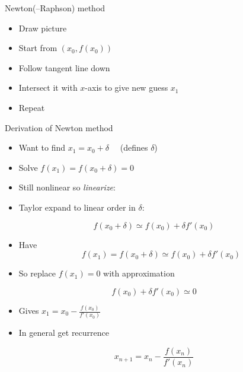 \begin{frame}{Newton(--Raphson) method}
\protect\hypertarget{newtonraphson-method}{}

\begin{itemize}
\item
  Draw picture
\item
  Start from \((x_0, f(x_0))\)
\item
  Follow tangent line down
\item
  Intersect it with \(x\)-axis to give new guess \(x_1\)
\item
  Repeat
\end{itemize}

\end{frame}

\begin{frame}{Derivation of Newton method}
\protect\hypertarget{derivation-of-newton-method}{}

\begin{itemize}
\item
  Want to find \(x_1 = x_0 + \delta \quad\) (defines \(\delta\))
\item
  Solve \(f(x_1) = f(x_0 + \delta) = 0\)
\item
  Still nonlinear so \emph{linearize}:
\item
  Taylor expand to linear order in \(\delta\):
\end{itemize}

\[f(x_0 + \delta) \simeq f(x_0) + \delta f'(x_0)\]

\end{frame}

\begin{frame}{}
\protect\hypertarget{section}{}

\begin{itemize}
\item
  Have \[f(x_1) = f(x_0 + \delta) \simeq f(x_0) + \delta f'(x_0)\]
\item
  So replace \(f(x_1) = 0\) with approximation
\end{itemize}

\[f(x_0) + \delta f'(x_0) \simeq 0\]

\begin{itemize}
\item
  Gives \(x_1 = x_0 - \frac{f(x_0)}{f'(x_0)}\)
\item
  In general get recurrence
\end{itemize}

\[\boxed{x_{n+1} = x_n - \frac{f(x_n)}{f'(x_n)}}\]

\end{frame}

